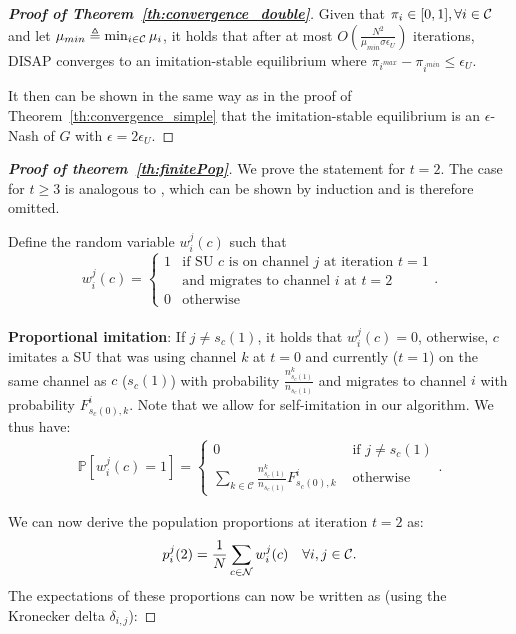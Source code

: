 \documentclass[12pt, onecolumn]{IEEEtran}
\theoremstyle{plain}
\theoremstyle{definition}
\begin{document}
\begin{proof}[\textbf{Proof of Theorem~\ref{th:convergence_double}}]
Given that $\pi_i\in[0,1], \forall i\in{\cal C}$ and let $\mu_{min}\triangleq \min_{i \in {\cal C}} \mu_i$, it holds that after at most $O(\frac{N^2}{\mu_{min}\sigma\epsilon_U})$ iterations, DISAP converges to an imitation-stable equilibrium where $\pi_{i^{max}}-\pi_{i^{min}}\le\epsilon_U$.

It then can be shown in the same way as in the proof of Theorem~\ref{th:convergence_simple} that the imitation-stable equilibrium is an $\epsilon$-Nash of $G$ with $\epsilon=2\epsilon_U$.
\end{proof}


\begin{proof}[\textbf{Proof of theorem~\ref{th:finitePop}}]

We prove the statement for $t=2$. The case for $t\ge 3$ is analogous to \cite{Schlag96}, which can be shown by induction and is therefore omitted.



Define the random variable $w_i^j(c)$ such that
\begin{equation*}
w_i^j(c)=
\begin{cases}
1 & \text{if SU $c$ is on channel $j$ at iteration $t=1$} \\
  & \text{and migrates to channel $i$ at $t=2$} \\
0 & \text{otherwise}
\end{cases}.
\end{equation*}
\\
{\bf Proportional imitation}: If $j\neq s_c(1)$, it holds that $w_i^j(c)=0$, otherwise, $c$ imitates a SU that was using channel $k$ at $t=0$ and currently ($t=1$) on the same channel as $c$ ($s_c(1)$) with probability
$\frac{n_{s_c(1)}^k}{n_{s_c(1)}}$ and migrates to channel $i$ with probability $F_{s_c(0),k}^{i}$. Note that we allow for self-imitation in our algorithm.
We thus have:
\begin{eqnarray*}
\mathbb{P}[w_i^j(c)=1] =
\begin{cases}
0 & \mbox{ if } j\neq s_c(1) \\
\displaystyle \sum_{k\in \mathcal{C}} \frac{n_{s_c(1)}^{k}}{n_{s_c(1)}}F_{s_c(0),k}^{i}  & \mbox{ otherwise}
\end{cases}.
\end{eqnarray*}


We can now derive the population proportions at iteration $t=2$ as:
\begin{equation*}
p_i^j(2)=\frac{1}{N}\sum_{c\in {\cal N}}w_i^j(c) \quad \forall i, j\in \mathcal{C}.
\end{equation*}
The expectations of these proportions can now be written as (using the Kronecker delta $\delta_{i,j}$):


\end{proof}
\end{document}
